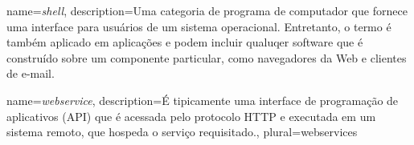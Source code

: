 				{name={\emph{shell}},
				 description={Uma categoria de programa de computador que fornece uma interface para usuários de um sistema operacional. Entretanto, o termo é também aplicado em aplicações e podem incluir qualuqer software que é construído sobre um componente particular, como navegadores da Web e clientes de e-mail.}
				 }

				{name={\emph{webservice}},
				 description={É tipicamente uma interface de programação de aplicativos (API) que é acessada pelo protocolo HTTP e executada em um sistema remoto, que hospeda o serviço requisitado.},
				 plural={webservices}
				 }